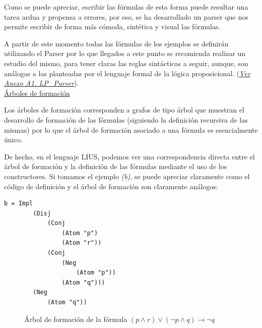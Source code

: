 \documentclass[a4paper]{report}
\begin{document}
Como se puede apreciar, escribir las fórmulas de esta forma puede resultar una tarea ardua y propensa a errores, por eso, se ha desarrollado un parser que nos permite escribir de forma más cómoda, sintética y visual las fórmulas. 

A partir de este momento todas las fórmulas de los ejemplos se definirán utilizando el Parser por lo que llegados a este punto se recomienda realizar un estudio del mismo, para tener claras las reglas sintácticas a seguir, aunque, son análogas a las planteadas por el lenguaje formal de la lógica proposicional. (\hyperref[sec:A1.LPParser]{\textit{\underline{Ver Anexo A1. LP\_Parser}}}). \\ 

\noindent\underline{Árboles de formación}

Los árboles de formación corresponden a grafos de tipo árbol que muestran el desarrollo de formación de las fórmulas (siguiendo la definición recursiva de las mismas) por lo que el árbol de formación asociado a una fórmula es esencialmente único.

De hecho, en el lenguaje LIUS, podemos ver una correspondencia directa entre el árbol de formación y la definición de las fórmulas mediante el uso de los constructores. Si tomamos el ejemplo \textit{(b)}, se puede apreciar claramente como el código de definición y el árbol de formación son claramente análogos:\\
\newpage

\begin{lstlisting}[caption= {Definición de $ (p \wedge r) \vee (\neg p \wedge q) \rightarrow \neg q$.}]
b = Impl 
        (Disj 
            (Conj 
            	(Atom "p") 
            	(Atom "r")) 
            (Conj 
            	(Neg 
            		(Atom "p")) 
            	(Atom "q"))) 
        (Neg 
        	(Atom "q"))
\end{lstlisting}

\begin{figure}[H]
\centering
{}
\caption{Árbol de formación de la fórmula $ (p \wedge r) \vee (\neg p \wedge q) \rightarrow \neg q$}
\end{figure}
\end{document}
